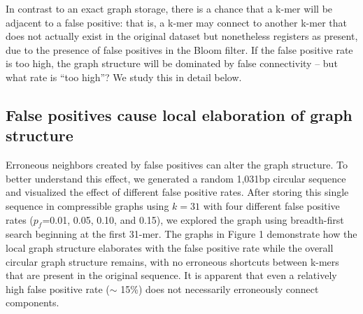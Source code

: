 \documentclass[12pt]{article} \usepackage{simplemargins}
\begin{document}
In contrast to an exact graph storage, there is a chance that a k-mer will
be adjacent to a false positive: that is, a k-mer may connect to another k-mer that does not
actually exist in the original dataset but nonetheless registers as present,
due to the presence of false positives in the Bloom filter.  If the false positive rate is too high, the graph structure will
be dominated by false connectivity -- but what rate is ``too high''?  We study this in detail below.

\subsection{False positives cause local elaboration of graph structure}

Erroneous neighbors created by false positives can alter the graph
structure.  To better understand this effect, we generated a random
1,031bp circular sequence and visualized the effect of different false
positive rates.  After storing this single sequence in compressible
graphs using $k=31$ with four different false positive rates
($p_f$=0.01, 0.05, 0.10, and 0.15), we explored the graph using
breadth-first search beginning at the first 31-mer.  The graphs in
Figure 1 demonstrate how the local graph structure elaborates with the
false positive rate while the overall circular graph structure
remains, with no erroneous shortcuts between k-mers that are present
in the original sequence.  It is apparent that even a relatively high false positive rate ($\sim$
15\%) does not necessarily erroneously connect components.
\end{document}
